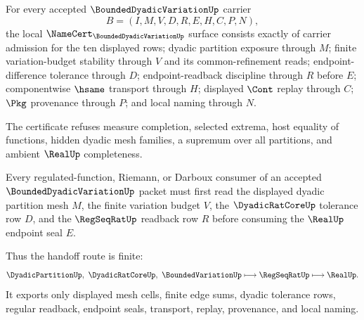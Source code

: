 \begin{theorem}
\label{thm:bounded-dyadic-variation-namecert-obligations}
For every accepted $\BoundedDyadicVariationUp$ carrier
$$
B=(I,M,V,D,R,E,H,C,P,N),
$$
the local $\NameCert_{\BoundedDyadicVariationUp}$ surface consists exactly of carrier admission for the ten displayed rows; dyadic partition exposure through $M$; finite variation-budget stability through $V$ and its common-refinement reads; endpoint-difference tolerance through $D$; endpoint-readback discipline through $R$ before $E$; componentwise $\hsame$ transport through $H$; displayed $\Cont$ replay through $C$; $\Pkg$ provenance through $P$; and local naming through $N$.

The certificate refuses measure completion, selected extrema, host equality of functions, hidden dyadic mesh families, a supremum over all partitions, and ambient $\RealUp$ completeness.
\end{theorem}

\begin{theorem}
\label{thm:bounded-dyadic-variation-finite-partition-handoff}
Every regulated-function, Riemann, or Darboux consumer of an accepted $\BoundedDyadicVariationUp$ packet must first read the displayed dyadic partition mesh $M$, the finite variation budget $V$, the $\DyadicRatCoreUp$ tolerance row $D$, and the $\RegSeqRatUp$ readback row $R$ before consuming the $\RealUp$ endpoint seal $E$.

Thus the handoff route is finite:
$$
\DyadicPartitionUp,\ \DyadicRatCoreUp,\ \BoundedVariationUp
\longmapsto
\RegSeqRatUp
\longmapsto
\RealUp.
$$
It exports only displayed mesh cells, finite edge sums, dyadic tolerance rows, regular readback, endpoint seals, transport, replay, provenance, and local naming.
\end{theorem}



